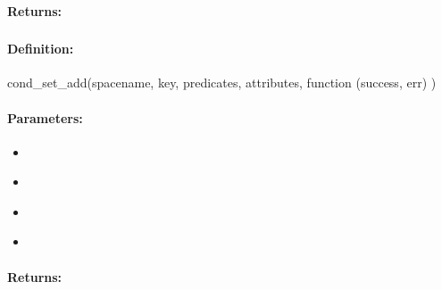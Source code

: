 \paragraph{Returns:}


\pagebreak
\subsubsection{}
\label{api:nodejs:cond_set_add}


\paragraph{Definition:}
\begin{javascriptcode}
cond_set_add(spacename, key, predicates, attributes, function (success, err) {})
\end{javascriptcode}
\paragraph{Parameters:}
\begin{itemize}[noitemsep]
\item {}\\

\item {}\\

\item {}\\

\item {}\\

\end{itemize}

\paragraph{Returns:}


\pagebreak
\subsubsection{}
\label{api:nodejs:group_set_add}


